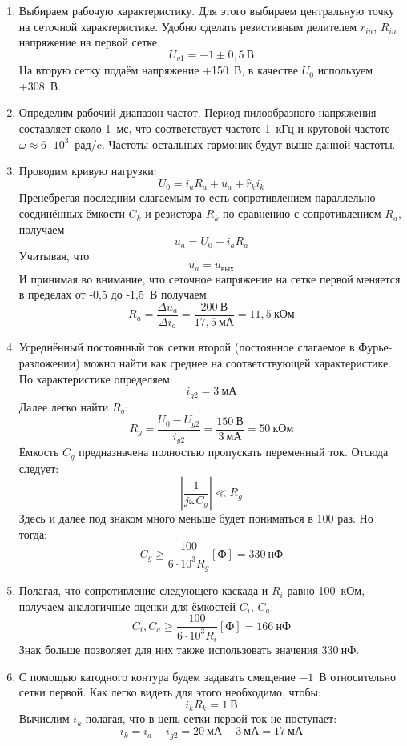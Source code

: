 \documentclass[a4paper,14pt]{extarticle}
\begin{document}
	\begin{enumerate}
		\item Выбираем рабочую характеристику. Для этого выбираем центральную точку на сеточной характеристике. Удобно сделать резистивным делителем $r_{in}$, $R_{in}$ напряжение на первой сетке
		\[
			U_{g1} = - 1 \pm 0{,}5~\text{В}
		\]
		На вторую сетку подаём напряжение +150~В, в качестве $U_0$ используем +308~В.
		\item Определим рабочий диапазон частот. Период пилообразного напряжения составляет около 1~мс, что соответствует частоте 1~кГц и круговой частоте $\omega \approx 6\cdot10^3$~рад/c. Частоты остальных гармоник будут выше данной частоты. 
		\item Проводим кривую нагрузки:
		\[
			U_0 = i_a R_a + u_a + \hat{r}_k i_k
		\]
		Пренебрегая последним слагаемым то есть сопротивлением параллельно соединённых ёмкости $C_k$ и резистора $R_k$ по сравнению с сопротивлением $R_a$, получаем
		\[
			u_a = U_0 - i_a R_a
		\]
		Учитывая, что
		\[
			u_a = u_{\text{вых}}
		\]
		И принимая во внимание, что сеточное напряжение на сетке первой меняется в пределах от -0,5 до -1,5~В получаем:
		\[
			R_a = \frac{\Delta u_a}{\Delta i_a} = \frac{200~\text{В}}{17{,}5~\text{мА}} = 11{,}5~\text{кОм}
		\]
		\item Усреднённый постоянный ток сетки второй (постоянное слагаемое в Фурье-разложении) можно найти как среднее на соответствующей характеристике. По характеристике определяем:
		\[
			i_{g2} = 3~\text{мА}
		\]
		Далее легко найти $R_g$:
		\[
			R_g = \frac{U_0 - U_{g2}}{i_{g2}} = \frac{150~\text{В}}{3~\text{мА}} = 50~\text{кОм}
		\]
		Ёмкость $C_g$ предназначена полностью пропускать переменный ток. Отсюда следует:
		\[
			\left|\frac{1}{j\omega C_g}\right| \ll R_g
		\]
		Здесь и далее под знаком много меньше будет пониматься в 100 раз. Но тогда:
		\[
			C_g \geq \frac{100}{6\cdot10^3 R_g} [\text{Ф}] = 330~\text{нФ} 
		\]
		\item Полагая, что сопротивление следующего каскада и $R_i$ равно 100~кОм, получаем аналогичные оценки для ёмкостей $C_i$, $C_a$:
		\[
			C_i, C_a \geq \frac{100}{6\cdot10^3 R_i} [\text{Ф}] = 166~\text{нФ}
		\]
		Знак больше позволяет для них также использовать значения $330~\text{нФ}$.
		\item С помощью катодного контура будем задавать смещение $-1$~В относительно сетки первой. Как легко видеть для этого необходимо, чтобы:
		\[
			i_k R_k = 1~\text{В} 
		\]
		Вычислим $i_k$ полагая, что в цепь сетки первой ток не поступает:
		\[
			i_k = i_a - i_{g2} = 20~\text{мА} - 3~\text{мА} = 17~\text{мА}
\]
\end{enumerate}
\end{document}
